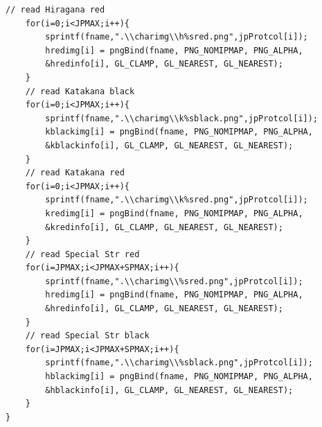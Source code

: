 \documentclass[a4j]{jarticle}
\begin{document}
\begin{lstlisting}[basicstyle=\ttfamily\footnotesize, frame=single,label=readImg,caption=readImg関数]
    // read Hiragana red
    for(i=0;i<JPMAX;i++){
        sprintf(fname,".\\charimg\\h%sred.png",jpProtcol[i]);
        hredimg[i] = pngBind(fname, PNG_NOMIPMAP, PNG_ALPHA, 
        &hredinfo[i], GL_CLAMP, GL_NEAREST, GL_NEAREST);
    }
    // read Katakana black
    for(i=0;i<JPMAX;i++){
        sprintf(fname,".\\charimg\\k%sblack.png",jpProtcol[i]);
        kblackimg[i] = pngBind(fname, PNG_NOMIPMAP, PNG_ALPHA, 
        &kblackinfo[i], GL_CLAMP, GL_NEAREST, GL_NEAREST);
    }
    // read Katakana red
    for(i=0;i<JPMAX;i++){
        sprintf(fname,".\\charimg\\k%sred.png",jpProtcol[i]);
        kredimg[i] = pngBind(fname, PNG_NOMIPMAP, PNG_ALPHA, 
        &kredinfo[i], GL_CLAMP, GL_NEAREST, GL_NEAREST);
    }
    // read Special Str red
    for(i=JPMAX;i<JPMAX+SPMAX;i++){
        sprintf(fname,".\\charimg\\%sred.png",jpProtcol[i]);
        hredimg[i] = pngBind(fname, PNG_NOMIPMAP, PNG_ALPHA, 
        &hredinfo[i], GL_CLAMP, GL_NEAREST, GL_NEAREST);
    }
    // read Special Str black
    for(i=JPMAX;i<JPMAX+SPMAX;i++){
        sprintf(fname,".\\charimg\\%sblack.png",jpProtcol[i]);
        hblackimg[i] = pngBind(fname, PNG_NOMIPMAP, PNG_ALPHA, 
        &hblackinfo[i], GL_CLAMP, GL_NEAREST, GL_NEAREST);
    }
}
      \end{lstlisting} 
\end{document}
